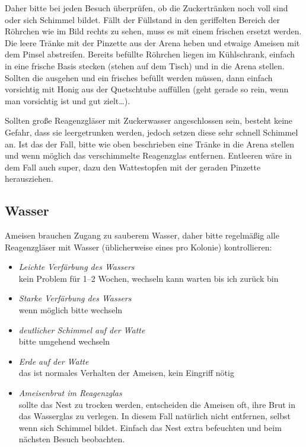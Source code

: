 Daher bitte bei jeden Besuch überprüfen, ob die Zuckertränken noch voll sind oder sich Schimmel bildet.
Fällt der Füllstand in den geriffelten Bereich der Röhrchen wie im Bild rechts zu sehen,
muss es mit einem frischen ersetzt werden.
Die leere Tränke mit der Pinzette aus der Arena heben und etwaige Ameisen mit dem Pinsel abstreifen.
Bereits befüllte Röhrchen liegen im Kühlschrank, einfach in eine frische Basis stecken (stehen auf dem Tisch)
und in die Arena stellen.
Sollten die ausgehen und ein frisches befüllt werden müssen, dann einfach vorsichtig mit Honig aus der Quetschtube auffüllen
(geht gerade so rein, wenn man vorsichtig ist und gut zielt\ldots{}).

Sollten große Reagenzgläser mit Zuckerwasser angeschlossen sein, besteht keine Gefahr,
dass sie leergetrunken werden, jedoch setzen diese sehr schnell Schimmel an.
Ist das der Fall, bitte wie oben beschrieben eine Tränke in die Arena stellen und
wenn möglich das verschimmelte Reagenzglas entfernen.
Entleeren wäre in dem Fall auch super, dazu den Wattestopfen mit der geraden Pinzette herausziehen.

\subsection{Wasser}\label{sec:Ameisen_sub:Wasser}
Ameisen brauchen Zugang zu sauberem Wasser, daher bitte regelmäßig alle Reagenzgläser mit Wasser
(üblicherweise eines pro Kolonie) kontrollieren:

\begin{itemize}
  \item\textit{Leichte Verfärbung des Wassers} \\
  kein Problem für 1--2 Wochen, wechseln kann warten bis ich zurück bin
  \item\textit{Starke Verfärbung des Wassers} \\
  wenn möglich bitte wechseln
  \item\textit{deutlicher Schimmel auf der Watte} \\
  bitte umgehend wechseln
  \item\textit{Erde auf der Watte} \\
  das ist normales Verhalten der Ameisen, kein Eingriff nötig
  \item\textit{Ameisenbrut im Reagenzglas} \\
  sollte das Nest zu trocken werden, entscheiden die Ameisen oft, ihre Brut in das Wasserglas zu verlegen.
  In diesem Fall natürlich nicht entfernen, selbst wenn sich Schimmel bildet.
  Einfach das Nest extra befeuchten und beim nächsten Besuch beobachten.
\end{itemize}

